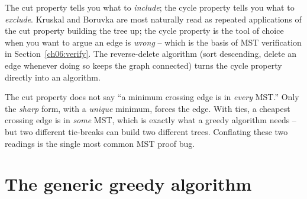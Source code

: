 \begin{center}
\end{center}

\begin{intuitionbox}
The cut property tells you what to \emph{include}; the cycle property tells you what to \emph{exclude}. Kruskal and Boruvka are most naturally read as repeated applications of the cut property building the tree up; the cycle property is the tool of choice when you want to argue an edge is \emph{wrong} -- which is the basis of MST verification in Section~\ref{ch06:verify}. The reverse-delete algorithm (sort descending, delete an edge whenever doing so keeps the graph connected) turns the cycle property directly into an algorithm.
\end{intuitionbox}

\begin{trapbox}
The cut property does not say ``a minimum crossing edge is in \emph{every} MST.'' Only the \emph{sharp} form, with a \emph{unique} minimum, forces the edge. With ties, a cheapest crossing edge is in \emph{some} MST, which is exactly what a greedy algorithm needs -- but two different tie-breaks can build two different trees. Conflating these two readings is the single most common MST proof bug.
\end{trapbox}

\section{The generic greedy algorithm}

